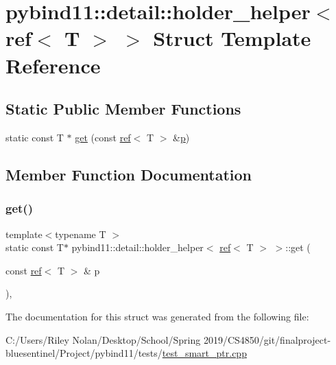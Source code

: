 \hypertarget{structpybind11_1_1detail_1_1holder__helper_3_01ref_3_01_t_01_4_01_4}{}\section{pybind11\+::detail\+::holder\+\_\+helper$<$ ref$<$ T $>$ $>$ Struct Template Reference}
\label{structpybind11_1_1detail_1_1holder__helper_3_01ref_3_01_t_01_4_01_4}
\subsection*{Static Public Member Functions}
\begin{DoxyCompactItemize}
\item 
static const T $\ast$ \mbox{\hyperlink{structpybind11_1_1detail_1_1holder__helper_3_01ref_3_01_t_01_4_01_4_a75a85eb320c813b8471c3d015210184d}{get}} (const \mbox{\hyperlink{classref}{ref}}$<$ T $>$ \&\mbox{\hyperlink{_s_d_l__opengl__glext_8h_aa5367c14d90f462230c2611b81b41d23}{p}})
\end{DoxyCompactItemize}


\subsection{Member Function Documentation}
\mbox{\label{structpybind11_1_1detail_1_1holder__helper_3_01ref_3_01_t_01_4_01_4_a75a85eb320c813b8471c3d015210184d}} 
\subsubsection{\texorpdfstring{get()}{get()}}
{\footnotesize\ttfamily template$<$typename T $>$ \\
static const T$\ast$ pybind11\+::detail\+::holder\+\_\+helper$<$ \mbox{\hyperlink{classref}{ref}}$<$ T $>$ $>$\+::get (\begin{DoxyParamCaption}\item[{const \mbox{\hyperlink{classref}{ref}}$<$ T $>$ \&}]{p }\end{DoxyParamCaption})\hspace{0.3cm}{\ttfamily [inline]}, {\ttfamily [static]}}



The documentation for this struct was generated from the following file\+:\begin{DoxyCompactItemize}
\item 
C\+:/\+Users/\+Riley Nolan/\+Desktop/\+School/\+Spring 2019/\+C\+S4850/git/finalproject-\/bluesentinel/\+Project/pybind11/tests/\mbox{\hyperlink{test__smart__ptr_8cpp}{test\+\_\+smart\+\_\+ptr.\+cpp}}\end{DoxyCompactItemize}
